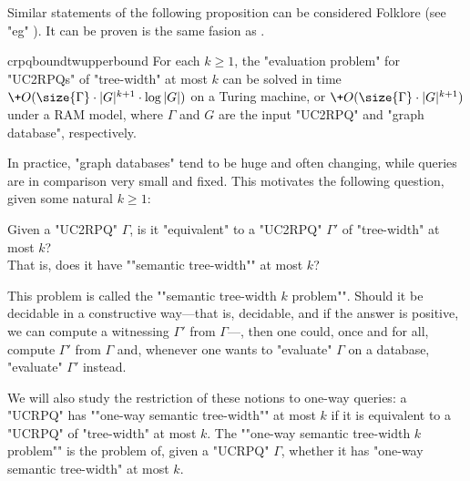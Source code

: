 Similar statements of the following proposition can be considered Folklore (see "eg" {\cite[Theorem IV.3]{RomeroBarceloVardi2017Homomorphism}}).
It can be proven is the same fasion as .
\begin{proposition}{crpqboundtwupperbound}
	\AP\label{prop:crpq-bound-tree-width-upper-bound}
    For each $k \geq 1$, the "evaluation problem" for "UC2RPQs" of "tree-width" at
    most $k$ can be solved in time $\+O(\size{\Gamma} \cdot |G|^{k+1} \cdot \log{|G|})$ on a Turing machine,
	or $\+O(\size{\Gamma} \cdot |G|^{k+1})$ under a RAM model, where $\Gamma$ and $G$ are the input "UC2RPQ" and "graph database", respectively.
\end{proposition}


In practice, "graph databases" tend to be huge and often changing, while queries
are in comparison very small and fixed.
This motivates the following question, given some natural $k \geq 1$: 

\begin{center}
    \AP 
    Given a "UC2RPQ" $\Gamma$, is it "equivalent" to a "UC2RPQ" $\Gamma'$ of "tree-width" at most $k$?\\
    That is, does it have ""semantic tree-width"" at most $k$?
\end{center}
This problem is called the ""semantic tree-width $k$ problem"".
Should it be decidable in a constructive way---that is, decidable, and if the answer is positive, we can compute a witnessing $\Gamma'$ from $\Gamma$---, then one could, once and for all,
compute $\Gamma'$ from $\Gamma$ and, whenever one wants to "evaluate" $\Gamma$ on a
database, "evaluate" $\Gamma'$ instead.

We will also study the restriction of these notions to one-way queries: a "UCRPQ" has \AP""one-way semantic tree-width"" at most $k$ if it is equivalent to a "UCRPQ" of "tree-width" at most $k$. The \AP""one-way semantic tree-width $k$ problem"" is the problem of, given a "UCRPQ" $\Gamma$, whether it has "one-way semantic tree-width" at most $k$.

